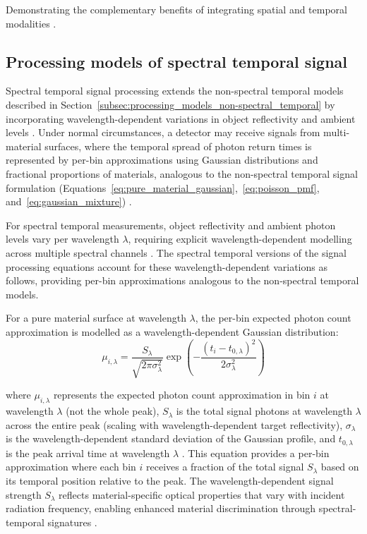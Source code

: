 \documentclass[12pt,a4paper,oneside]{report}
\begin{document}
Demonstrating the complementary benefits of integrating spatial and temporal modalities \cite{yang2024,moramartin2021}.



\subsection{Processing models of spectral temporal signal}
\label{subsubsec:processing_models_spectral_temporal}

Spectral temporal signal processing extends the non-spectral temporal models described in Section~\ref{subsec:processing_models_non-spectral_temporal} by incorporating wavelength-dependent variations in object reflectivity and ambient levels \cite{inagaki2020,su2016}. Under normal circumstances, a detector may receive signals from multi-material surfaces, where the temporal spread of photon return times is represented by per-bin approximations using Gaussian distributions and fractional proportions of materials, analogous to the non-spectral temporal signal formulation (Equations~\ref{eq:pure_material_gaussian},~\ref{eq:poisson_pmf}, and~\ref{eq:gaussian_mixture}) \cite{tontini2020,koerner2021}.

For spectral temporal measurements, object reflectivity and ambient photon levels vary per wavelength $\lambda$, requiring explicit wavelength-dependent modelling across multiple spectral channels \cite{inagaki2020,heinz2001}. The spectral temporal versions of the signal processing equations account for these wavelength-dependent variations as follows, providing per-bin approximations analogous to the non-spectral temporal models.

For a pure material surface at wavelength $\lambda$, the per-bin expected photon count approximation is modelled as a wavelength-dependent Gaussian distribution:
\begin{equation}
\mu_{i,\lambda} = \frac{S_\lambda}{\sqrt{2\pi\sigma_\lambda^2}} \exp\left(-\frac{(t_i - t_{0,\lambda})^2}{2\sigma_\lambda^2}\right)
\label{eq:spectral_temporal_pure_material}
\end{equation}

where $\mu_{i,\lambda}$ represents the expected photon count approximation in bin $i$ at wavelength $\lambda$ (not the whole peak), $S_\lambda$ is the total signal photons at wavelength $\lambda$ across the entire peak (scaling with wavelength-dependent target reflectivity), $\sigma_\lambda$ is the wavelength-dependent standard deviation of the Gaussian profile, and $t_{0,\lambda}$ is the peak arrival time at wavelength $\lambda$ \cite{tontini2020,koerner2021}. This equation provides a per-bin approximation where each bin $i$ receives a fraction of the total signal $S_\lambda$ based on its temporal position relative to the peak. The wavelength-dependent signal strength $S_\lambda$ reflects material-specific optical properties that vary with incident radiation frequency, enabling enhanced material discrimination through spectral-temporal signatures \cite{inagaki2020,su2016,becker2023}.
\end{document}
